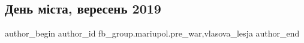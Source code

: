  
 
 
 
 

\subsection{День міста, вересень 2019}
\label{sec:11_01_2023.fb.fb_group.mariupol.pre_war.1.den_m_sta__veresen_2}
 
\ifcmt
 author_begin
   author_id fb_group.mariupol.pre_war,vlasova_lesja
 author_end
\fi
